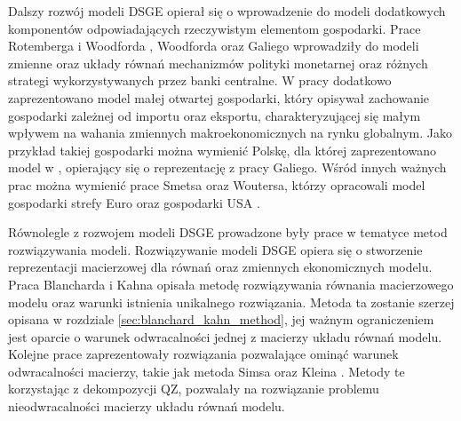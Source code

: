Dalszy rozwój modeli DSGE opierał się o wprowadzenie do modeli dodatkowych komponentów odpowiadających rzeczywistym elementom gospodarki. Prace Rotemberga i Woodforda \cite{doi:10.1086/654340}, Woodforda \cite{woodford_2005} oraz Galiego \cite{gali} wprowadziły do modeli zmienne oraz układy równań mechanizmów polityki monetarnej oraz różnych strategi wykorzystywanych przez banki centralne. W pracy \cite{gali} dodatkowo zaprezentowano model małej otwartej gospodarki, który opisywał zachowanie gospodarki zależnej od importu oraz eksportu, charakteryzującej się małym wpływem na wahania zmiennych makroekonomicznych na rynku globalnym. Jako przykład takiej gospodarki można wymienić Polskę, dla której zaprezentowano model w \cite{nbpKoloch}, opierający się o reprezentację z pracy Galiego. Wśród innych ważnych prac można wymienić prace Smetsa oraz Woutersa, którzy opracowali model gospodarki strefy Euro \cite{10.1162/154247603770383415} oraz gospodarki USA \cite{10.1257/aer.97.3.586}.

Równolegle z rozwojem modeli DSGE prowadzone były prace w tematyce metod rozwiązywania modeli. Rozwiązywanie modeli DSGE opiera się o stworzenie reprezentacji macierzowej dla równań oraz zmiennych ekonomicznych modelu. Praca Blancharda i Kahna \cite{10.2307/1912186} opisała metodę rozwiązywania równania macierzowego modelu oraz warunki istnienia unikalnego rozwiązania. Metoda ta zostanie szerzej opisana w rozdziale \ref{sec:blanchard_kahn_method}, jej ważnym ograniczeniem jest oparcie o warunek odwracalności jednej z macierzy układu równań modelu. Kolejne prace zaprezentowały rozwiązania pozwalające ominąć warunek odwracalności macierzy, takie jak metoda Simsa \cite{sims} oraz Kleina \cite{KLEIN20001405}. Metody te korzystając z dekompozycji QZ, pozwalały na rozwiązanie problemu nieodwracalności macierzy układu równań modelu. 

